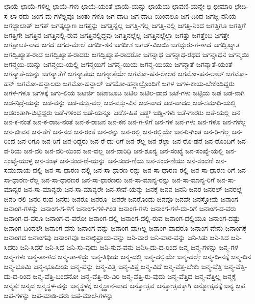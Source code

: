 {ಛಾಯೆ
ಛಾಯೆ-ಗಳಿಲ್ಲ
ಛಾಯೆ-ಗಳು
ಛಾಯೆ-ಯಂತೆ
ಛಾಯೆ-ಯನ್ನು
ಛಾಯೆಯ
ಛಾವಣಿ-ಯನ್ನೇ
ಛಿ
ಛೀಮಾರಿ
ಛೇದಿ-ಸ-ಲಾ-ರದು
ಜಂಗ-ಮ-ಗಳೆಲ್ಲವೂ
ಜಂತು-ಗಳೂ
ಜಗ-ದಾದಿ
ಜಗ-ದಾದಿ-ಯಿಂದಲೂ
ಜಗ-ದಿಂದ
ಜಗಜ್ಜ-ನನಿಯ
ಜಗಜ್ಜಾಲಾತ್
ಜಗತ್
ಜಗತ್ಕಲ್ಯಾಣ
ಜಗತ್ತನ್ನು
ಜಗತ್ತನ್ನೆಲ್ಲ
ಜಗತ್ತಿ-ಗೆಲ್ಲ
ಜಗತ್ತಿ-ನಲ್ಲಿ
ಜಗತ್ತಿ-ನಿಂದ
ಜಗತ್ತಿಗೂ
ಜಗತ್ತಿಗೆ
ಜಗತ್ತಿಗೇ
ಜಗತ್ತಿನ
ಜಗತ್ತಿನಲ್ಲಿ-ರುವ
ಜಗತ್ತಿನಲ್ಲಿದ್ದವು
ಜಗತ್ತಿನಲ್ಲೆಲ್ಲ
ಜಗತ್ತಿನಲ್ಲೆಲ್ಲಾ
ಜಗತ್ತು
ಜಗತ್ತೆಂಬ
ಜಗತ್ತೇ
ಜಗತ್ಪಾಲಕ-ನಾದ
ಜಗದ
ಜಗದ-ಮೇಲೆ
ಜಗದೀ-ಶನ
ಜಗದೀಶ
ಜಗದ್-ವಿಜಯಿ
ಜಗದ್ಗುರು-ಗ-ಳಾದ
ಜಗದ್ವಿಖ್ಯಾತ
ಜಗದ್ವಿಖ್ಯಾತ-ರಾದ
ಜಗದ್ವಿಖ್ಯಾತ-ರಾದರು
ಜಗದ್ವಿಖ್ಯಾತ-ರಾದರೋ
ಜಗನ್ನಾಥ
ಜಗನ್ನಾಥ-ರಥದ
ಜಗನ್ನಾಥನ
ಜಗನ್ಮಯಿ
ಜಗನ್ಮಯಿ-ಯನ್ನು
ಜಗನ್ಮಯಿ-ಯಲ್ಲಿ
ಜಗನ್ಮಯಿಗೆ
ಜಗನ್ಮ-ಯಿಯ
ಜಗನ್ಮ-ಯಿಯು
ಜಗನ್ಮಾತೆ
ಜಗನ್ಮಾತೆ-ಯಂತೆ
ಜಗನ್ಮಾತೆ-ಯನ್ನು
ಜಗನ್ಮಾತೆಗೆ
ಜಗನ್ಮಾತೆಯ
ಜಗನ್ಮಾತೆಯೇ
ಜಗಮೋ-ಹನ-ಲಾಲರ
ಜಗಮೋ-ಹನ-ಲಾಲ್
ಜಗಮೋ-ಹನ್
ಜಗಮೋ-ಹನ್ಲಾಲರು
ಜಗಮೋ-ಹನ್ಲಾಲ್
ಜಗಮೋ-ಹನ್ಲಾಲ್ರೊಂದಿಗೆ
ಜಗಳ
ಜಗಳ-ಕಾಯ-ಬೇಕೆಂದಿದ್ದರು
ಜಗಳ-ಗಳೂ
ಜಗಳಕ್ಕೆ
ಜಗು-ಲಿಯ
ಜಟರ್ಜಿ
ಜಟಾಜೂಟ
ಜಟಿಲ
ಜಟಿಲ-ವಾದ
ಜಟೆ-ಗಳು
ಜಟ್ಟಿಯ
ಜಡ
ಜಡ-ನಾಗಿ
ಜಡ-ನಿದ್ರೆ-ಯನ್ನು
ಜಡ-ವನ್ನು
ಜಡ-ವಸ್ತು-ವಲ್ಲ
ಜಡ-ವಸ್ತು-ವಿನ
ಜಡ-ವಾದ
ಜಡ-ವಾದದ
ಜಡ-ಸಮಾಧಿ-ಯಲ್ಲಿ
ಜಡರಂತಾಗಿ-ಬಿಟ್ಟಿದ್ದರು
ಜಡೆ-ಗಳಿಂದ
ಜಡೆ-ಯನ್ನೂ
ಜಡೆಸ-ಹಿತ
ಜಡ್ಜ್
ಜಡ್ಡಿ-ಗಳು
ಜತೆ-ಗಾರರು
ಜತೆ-ಯಲ್ಲಿ
ಜನ
ಜನ-ಕ-ನಂತೆ
ಜನ-ಕ-ರಾಜ-ನಂತೆ
ಜನ-ಕ-ರಾಜನ
ಜನ-ಕನ
ಜನ-ಗ-ಳಿಗೆ
ಜನ-ಗಳ
ಜನ-ಗಳು
ಜನ-ಗಳೂ
ಜನ-ಗಳೆಲ್ಲ
ಜನ-ಜೀವನ
ಜನ-ತೆಗೆ
ಜನ-ನದ
ಜನ-ರಂತೆ
ಜನ-ರನ್ನು
ಜನ-ರಲ್ಲಿ
ಜನ-ರಲ್ಲಿಯೇ
ಜನ-ರಿ-ಗಿಂತ
ಜನ-ರಿ-ಗೆಲ್ಲ
ಜನ-ರಿಂದ
ಜನ-ರಿಗೂ
ಜನ-ರಿಗೆ
ಜನ-ರಿದ್ದರು
ಜನ-ರೆ-ದು-ರಿಗೆ
ಜನ-ರೆಲ್ಲ
ಜನ-ರೆಲ್ಲಾ
ಜನ-ರೊ-ಡನೆ
ಜನ-ರೊಂದಿಗೆ
ಜನ-ವ-ರಿಯ
ಜನ-ವರಿ
ಜನ-ವರಿ-ಯಿಂದ
ಜನ-ವಲ್ಲ
ಜನ-ವಾರಿಧಿ
ಜನ-ಶೂನ್ಯ
ಜನ-ಸಂಖ್ಯೆ
ಜನ-ಸಂಖ್ಯೆ-ಯಲ್ಲಿ
ಜನ-ಸಂಖ್ಯೆ-ಯುಳ್ಳ
ಜನ-ಸಂಘ
ಜನ-ಸಂದ-ಣಿ-ಯನ್ನು
ಜನ-ಸಂದ-ಣಿಯ
ಜನ-ಸಂದ-ಣಿಯು
ಜನ-ಸಂದಣಿ
ಜನ-ಸಮುದಾಯ-ದಲ್ಲಿ
ಜನ-ಸಾ-ಧಾರಣ-ದಲ್ಲಿ
ಜನ-ಸಾ-ಧಾರಣ-ರನ್ನು
ಜನ-ಸಾ-ಧಾರಣ-ರಲ್ಲಿ
ಜನ-ಸಾ-ಧಾರಣ-ರಿಗೆ
ಜನ-ಸಾ-ಧಾರಣ-ರೆಲ್ಲ
ಜನ-ಸಾ-ಧಾರಣರ
ಜನ-ಸಾ-ಧಾರಣರು
ಜನ-ಸಾ-ಮಾನ್ಯ-ರನ್ನು
ಜನ-ಸಾ-ಮಾನ್ಯ-ರಿಗೆ
ಜನ-ಸಾ-ಮಾನ್ಯರ
ಜನ-ಸಾ-ಮಾನ್ಯರು
ಜನ-ಸಾ-ಮಾನ್ಯರೇ
ಜನ-ಸೇವೆ-ಯನ್ನು
ಜನಕ್ಕೆ
ಜನನ
ಜನನಿ
ಜನರ
ಜನರಲ್
ಜನರಲ್ಲೆ
ಜನರಿ-ರಲಿ
ಜನರಿ-ರುವ
ಜನರು
ಜನರೂ
ಜನರೂ-
ಜನರೇ
ಜನರೊಂದು
ಜನವೂ
ಜನವೇ
ಜನಸ್ತೋಮ
ಜನಾಂಗ
ಜನಾಂಗ-ಗಳನ್ನು
ಜನಾಂಗ-ಗ-ಳಿಗೆ
ಜನಾಂಗ-ಗಳಿ-ಗಿಂತ
ಜನಾಂಗ-ಗಳು
ಜನಾಂಗ-ಗಳೆ-ದು-ರಿಗೆ
ಜನಾಂಗ-ದ-ವರು
ಜನಾಂಗ-ದ-ವರೂ
ಜನಾಂಗ-ದ-ವರೋ
ಜನಾಂಗ-ದಲ್ಲಿ
ಜನಾಂಗ-ದಲ್ಲಿ-ರುವ
ಜನಾಂಗ-ದಲ್ಲಿಯೂ
ಜನಾಂಗ-ದಷ್ಟು
ಜನಾಂಗ-ದಿಂದಲೇ
ಜನಾಂಗ-ವನು
ಜನಾಂಗ-ವನ್ನು
ಜನಾಂಗ-ವಾಗಿಲ್ಲ
ಜನಾಂಗ-ವಾದರೂ
ಜನಾಂಗ-ವೇನು
ಜನಾಂಗಕ್ಕೆ
ಜನಾಂಗದ
ಜನಾಂಗವು
ಜನಾಂಗವೂ
ಜನಾಭಿಪ್ರಾಯ-ವನ್ನು
ಜನಿ-ವಾರ
ಜನಿ-ವಾರ-ವನ್ನು
ಜನಿ-ಸಿತು
ಜನಿ-ಸಿದ
ಜನಿ-ಸಿದರು
ಜನಿ-ಸಿದರೆ
ಜನಿ-ಸಿದೆ
ಜನಿ-ಸು-ವುದು
ಜನಿ-ಸುವ-ವನು
ಜನಿಸಿ-ದು-ದ-ರಿಂದ
ಜನ್ಮ
ಜನ್ಮ-ಗಳನ್ನು
ಜನ್ಮ-ಗಳ
ಜನ್ಮ-ಗಳು
ಜನ್ಮ-ತಾ-ಳಿದ
ಜನ್ಮ-ತಾ-ಳಿದ್ದು
ಜನ್ಮ-ತಿಥಿಯ
ಜನ್ಮ-ದಲ್ಲಿ
ಜನ್ಮ-ದಲ್ಲಿಯೇ
ಜನ್ಮ-ದಲ್ಲೇ
ಜನ್ಮ-ದಿ-ನಕ್ಕೆ
ಜನ್ಮ-ದಿನ
ಜನ್ಮ-ಭೂಮಿ
ಜನ್ಮ-ಭೂಮಿಯ
ಜನ್ಮ-ವನ್ನು
ಜನ್ಮ-ವಿತ್ತ
ಜನ್ಮ-ವಿತ್ತೆ
ಜನ್ಮ-ವಿದೆ
ಜನ್ಮ-ವೆತ್ತ-ಬೇಕು
ಜನ್ಮ-ವೆತ್ತಿ
ಜನ್ಮ-ವೆತ್ತಿ-ದು-ದ-ರಿಂದ
ಜನ್ಮ-ವೆತ್ತಿ-ಬಂದನೋ
ಜನ್ಮ-ವೆತ್ತಿ-ರು-ವಿರಿ
ಜನ್ಮ-ವೆತ್ತಿ-ರು-ವುದು
ಜನ್ಮ-ವೆತ್ತಿದ
ಜನ್ಮ-ವೆತ್ತಿಲ್ಲ
ಜನ್ಮಕ್ಕೆ
ಜನ್ಮತಃ
ಜನ್ಮದ
ಜನ್ಮಸ್ಥಳ-ವನ್ನು
ಜನ್ಮಸ್ಥಳಕ್ಕೆ
ಜನ್ಮಸ್ಥಾನ-ವಾದ
ಜನ್ಮೋತ್ಸವ
ಜನ್ಮೋತ್ಸವಕ್ಕಾಗಿ
ಜನ್ಮೋತ್ಸವಕ್ಕೆ
ಜನ್ಯ
ಜಪ
ಜಪ-ಗಳನ್ನು
ಜಪ-ಮಾಡಿ-ದರು
ಜಪ-ಮಾಲೆ-ಗಳನ್ನು
}
